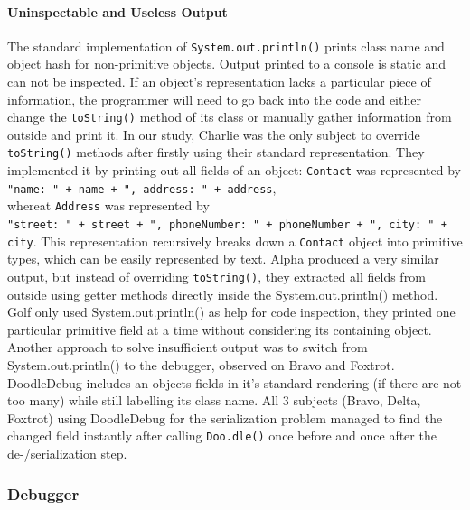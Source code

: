 \documentclass[english]{acm_proc_article-sp}
\begin{document}
\paragraph{Uninspectable and Useless Output}
The standard implementation of \verb-System.out.println()- prints class name and object hash for non-primitive objects. Output printed to a console is static and can not be inspected. If an object's representation lacks a particular piece of information, the programmer will need to go back into the code and either change the \verb.toString(). method of its class or manually gather information from outside and print it. In our study, Charlie was the only subject to override \verb.toString(). methods after firstly using their standard representation. They implemented it by printing out all fields of an object: \verb.Contact. was represented by\\
\verb-"name: " + name + ", address: " + address-,\\
whereat \verb.Address. was represented by\\
\verb-"street: " + street + ", phoneNumber: " + phoneNumber + ", city: " + city-.
This representation recursively breaks down a \verb.Contact. object into primitive types, which can be easily represented by text. Alpha produced a very similar output, but instead of overriding \verb.toString()., they extracted all fields from outside using getter methods directly inside the System.out.println() method. Golf only used System.out.println() as help for code inspection, they printed one particular primitive field at a time without considering its containing object.\\
Another approach to solve insufficient output was to switch from System.out.println() to the debugger, observed on Bravo and Foxtrot.\\
DoodleDebug includes an objects fields in it's standard rendering (if there are not too many) while still labelling its class name. All 3 subjects (Bravo, Delta, Foxtrot) using DoodleDebug for the serialization problem managed to find the changed field instantly after calling \verb-Doo.dle()- once before and once after the de-/serialization step.


\subsubsection{Debugger}
\end{document}
